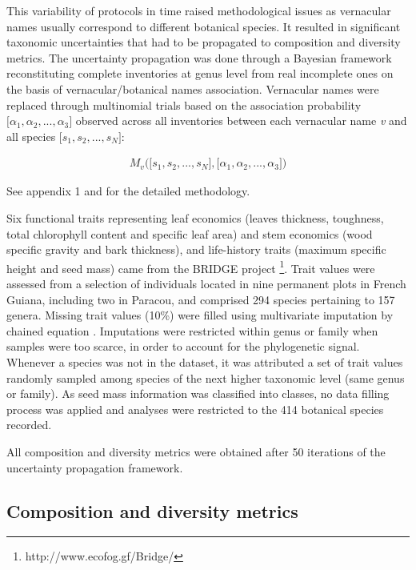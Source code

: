 \documentclass[fleqn,10pt]{ArtEcoFoG} %
\begin{document}
This variability of protocols in time raised methodological issues as
vernacular names usually correspond to different botanical species. It
resulted in significant taxonomic uncertainties that had to be
propagated to composition and diversity metrics. The uncertainty
propagation was done through a Bayesian framework reconstituting
complete inventories at genus level from real incomplete ones on the
basis of vernacular/botanical names association. Vernacular names were
replaced through multinomial trials based on the association probability
\(\big[\alpha_1, \alpha_2,..., \alpha_3\big]\) observed across all
inventories between each vernacular name \emph{v} and all species
\(\big[s_1, s_2,..., s_N\big]\):

\begin{align}
M_v\Big(\big[s_1, s_2,..., s_N\big],\big[\alpha_1, \alpha_2,..., \alpha_3\big]\Big) \nonumber
\end{align}

See appendix 1 and \citet{Aubry-Kientz2013} for the detailed
methodology.

Six functional traits representing leaf economics (leaves thickness,
toughness, total chlorophyll content and specific leaf area) and stem
economics (wood specific gravity and bark thickness), and life-history
traits (maximum specific height and seed mass) came from the BRIDGE
project \footnote{http://www.ecofog.gf/Bridge/}. Trait values were
assessed from a selection of individuals located in nine permanent plots
in French Guiana, including two in Paracou, and comprised 294 species
pertaining to 157 genera. Missing trait values (10\%) were filled using
multivariate imputation by chained equation \citep{Mice2011}.
Imputations were restricted within genus or family when samples were too
scarce, in order to account for the phylogenetic signal. Whenever a
species was not in the dataset, it was attributed a set of trait values
randomly sampled among species of the next higher taxonomic level (same
genus or family). As seed mass information was classified into classes,
no data filling process was applied and analyses were restricted to the
414 botanical species recorded.

All composition and diversity metrics were obtained after 50 iterations
of the uncertainty propagation framework.

\subsection{Composition and diversity
metrics}\label{composition-and-diversity-metrics}
\end{document}
